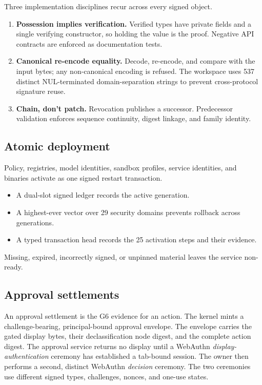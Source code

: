 \documentclass[letterpaper,twocolumn,10pt]{article}
\newcommand{\code}[1]{\texttt{\detokenize{#1}}}
\begin{document}
Three implementation disciplines recur across every signed object.
\begin{enumerate}
\item \textbf{Possession implies verification.} Verified types have private
  fields and a single verifying constructor, so holding the value is the
  proof. Negative API contracts are enforced as \code{compile_fail}
  documentation tests.
\item \textbf{Canonical re-encode equality.} Decode, re-encode, and compare
  with the input bytes; any non-canonical encoding is refused. The
  workspace uses 537 distinct NUL-terminated domain-separation strings to
  prevent cross-protocol signature reuse.
\item \textbf{Chain, don't patch.} Revocation publishes a successor.
  Predecessor validation enforces sequence continuity, digest linkage, and
  family identity.
\end{enumerate}

\subsection{Atomic deployment}

Policy, registries, model identities, sandbox profiles, service
identities, and binaries activate as one signed restart transaction.
\begin{itemize}
\item A dual-slot signed ledger records the active generation.
\item A highest-ever vector over 29 security domains prevents rollback
  across generations.
\item A typed transaction head records the 25 activation steps and their
  evidence.
\end{itemize}
Missing, expired, incorrectly signed, or unpinned material leaves the
service non-ready.

\subsection{Approval settlements}

An approval settlement is the G6 evidence for an action. The kernel mints
a challenge-bearing, principal-bound approval envelope. The envelope
carries the gated display bytes, their declassification node digest, and
the complete action digest. The approval service returns no display until
a WebAuthn \emph{display-authentication} ceremony has established a
tab-bound session. The owner then performs a second, distinct WebAuthn
\emph{decision} ceremony. The two ceremonies use different signed types,
challenges, nonces, and one-use states.
\end{document}
